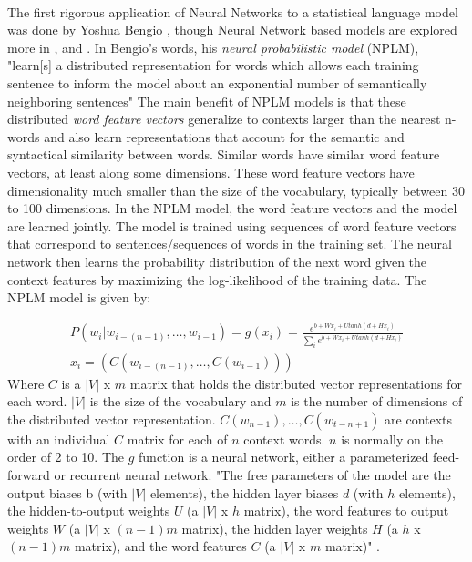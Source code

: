\documentclass[12pt]{ociamthesis}
\begin{document}
\paragraph{}
The first rigorous application of Neural Networks to a statistical language model was done by Yoshua Bengio \cite{Bengio2003}, though Neural Network based models are explored more in \cite{Collobert2008}, and \cite{HuangEtAl2012} . In Bengio's words, his \emph{neural probabilistic model} (NPLM), "learn[s] a distributed representation for words which allows each training sentence to inform the model about an exponential number of semantically neighboring sentences" \cite[pg. 1137]{Bengio2003} The main benefit of NPLM models is that these distributed \emph{word feature vectors} generalize to contexts larger than the nearest n-words and also learn representations that account for the semantic and syntactical similarity between words. Similar words have similar word feature vectors, at least along some dimensions. These word feature vectors have dimensionality much smaller than the size of the vocabulary, typically between 30 to 100 dimensions. In the NPLM model, the word feature vectors and the model are learned jointly. The model is trained using sequences of word feature vectors that correspond to sentences/sequences of words in the training set. The neural network then learns the probability distribution of the next word given the context features by maximizing the log-likelihood of the training data. 
The NPLM model is given by:

\begin{align}
P(w_i | w_{i-(n-1)},\dots, w_{i-1}) = g(x_i) = \frac {e^{b+Wx_i+Utanh(d+Hx_i)}} {\sum_i e^{b+Wx_i+Utanh(d+Hx_i)}} \label{FFNN}
\\x_i=\left(C(w_{i-(n-1)}, \dots, C(w_{i-1}) )\right)
\end{align}
Where $C$ is a $|V|$ x $m$ matrix that holds the distributed vector representations for each word.  $|V|$ is the size of the vocabulary and $m$ is the number of dimensions of the distributed vector representation. $C(w_{n-1}), \dots, C(w_{t-n+1})$ are contexts with an individual $C$ matrix for each of $n$ context words. $n$ is normally on the order of 2 to 10. The $g$ function is a neural network, either a parameterized feed-forward or recurrent neural network. 
"The free parameters of the model are the output biases b (with $|V|$ elements), the hidden layer biases $d$ (with $h$ elements), the hidden-to-output weights $U$ (a $|V|$ x $h$ matrix), the word features to output weights $W$ (a $|V|$ x $(n-1)m$ matrix), the hidden layer weights $H$ (a $h$ x $(n-1)m$ matrix), and the word features $C$ (a $|V|$ x $m$ matrix)" \cite[pg. 1143]{Bengio2003}.
\end{document}
